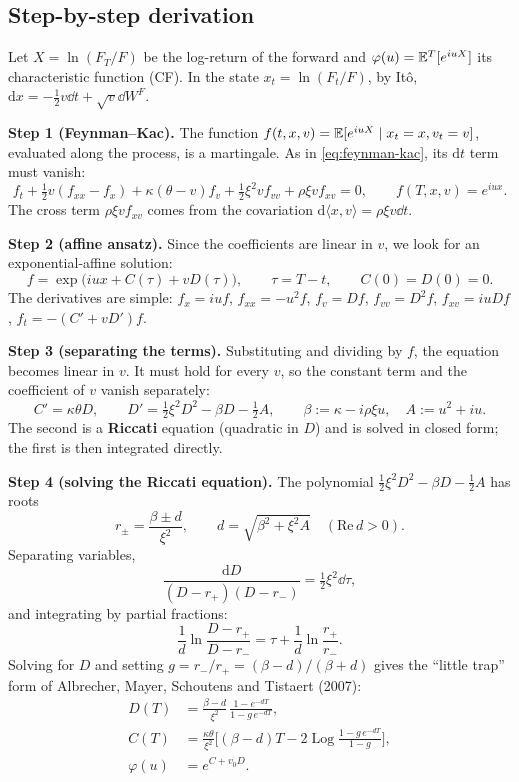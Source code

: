 \subsection{Step-by-step derivation}
Let $X=\ln(F_T/F)$ be the log-return of the forward and $\varphi(u)=\mathbb{E}^T[e^{iuX}]$ its characteristic function (CF).
In the state $x_t=\ln(F_t/F)$, by Itô, $\mathrm{d}x=-\tfrac12v\dd t+\sqrt v\dd W^F$.

\textbf{Step 1 (Feynman--Kac).} The function $f(t,x,v)=\mathbb{E}[e^{iuX}\mid x_t=x,v_t=v]$, evaluated along the process, is a
martingale. As in \eqref{eq:feynman-kac}, its $\mathrm{d}t$ term must vanish:
\begin{equation}\label{eq:heston-pde}
f_t+\tfrac12v(f_{xx}-f_x)+\kappa(\theta-v)f_v+\tfrac12\xi^2vf_{vv}+\rho\xi vf_{xv}=0,\qquad f(T,x,v)=e^{iux}.
\end{equation}
The cross term $\rho\xi v f_{xv}$ comes from the covariation $\mathrm{d}\langle x,v\rangle=\rho\xi v\dd t$.

\textbf{Step 2 (affine ansatz).} Since the coefficients are linear in $v$, we look for an exponential-affine solution:
\[
f=\exp\big(iux+C(\tau)+vD(\tau)\big),\qquad \tau=T-t,\qquad C(0)=D(0)=0 .
\]
The derivatives are simple: $f_x=iuf$, $f_{xx}=-u^2f$, $f_v=Df$, $f_{vv}=D^2f$, $f_{xv}=iuDf$, $f_t=-(C'+vD')f$.

\textbf{Step 3 (separating the terms).} Substituting and dividing by $f$, the equation becomes linear in $v$. It must
hold for every $v$, so the constant term and the coefficient of $v$ vanish separately:
\begin{equation}\label{eq:riccati}
C'=\kappa\theta D,\qquad D'=\tfrac12\xi^2D^2-\beta D-\tfrac12A,
\qquad\beta:=\kappa-i\rho\xi u,\quad A:=u^2+iu .
\end{equation}
The second is a \textbf{Riccati} equation (quadratic in $D$) and is solved in closed form; the first is then
integrated directly.

\textbf{Step 4 (solving the Riccati equation).} The polynomial $\tfrac12\xi^2D^2-\beta D-\tfrac12A$ has roots
\[
r_\pm=\frac{\beta\pm d}{\xi^2},\qquad d=\sqrt{\beta^2+\xi^2A}\quad(\mathrm{Re}\,d>0).
\]
Separating variables,
\[
\frac{\mathrm{d}D}{(D-r_+)(D-r_-)}=\tfrac12\xi^2\dd\tau ,
\]
and integrating by partial fractions:
\[
\frac1d\ln\frac{D-r_+}{D-r_-}=\tau+\frac1d\ln\frac{r_+}{r_-}.
\]
Solving for $D$ and setting $g=r_-/r_+=(\beta-d)/(\beta+d)$ gives the ``little trap'' form of Albrecher, Mayer,
Schoutens and Tistaert (2007):
\begin{align}
D(T)&=\frac{\beta-d}{\xi^2}\,\frac{1-e^{-dT}}{1-g\,e^{-dT}},\label{eq:heston-D}\\
C(T)&=\frac{\kappa\theta}{\xi^2}\Big[(\beta-d)T-2\operatorname{Log}\frac{1-g\,e^{-dT}}{1-g}\Big],\label{eq:heston-C}\\
\varphi(u)&=e^{C+v_0D}.\label{eq:heston-cf}
\end{align}

